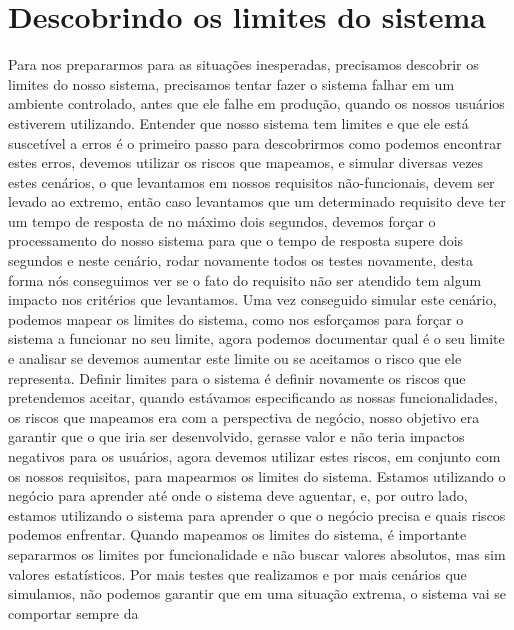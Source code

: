     \section{Descobrindo os limites do sistema}
      Para nos prepararmos para as situações inesperadas, precisamos descobrir os
      limites do nosso sistema, precisamos tentar fazer o sistema falhar em um
      ambiente controlado, antes que ele falhe em produção, quando os nossos usuários
      estiverem utilizando. Entender que nosso sistema tem limites e que ele está
      suscetível a erros é o primeiro passo para descobrirmos como podemos encontrar
      estes erros, devemos utilizar os riscos que mapeamos, e simular diversas vezes
      estes cenários, o que levantamos em nossos requisitos não-funcionais, devem
      ser levado ao extremo, então caso levantamos que um determinado requisito
      deve ter um tempo de resposta de no máximo dois segundos, devemos forçar o
      processamento do nosso sistema para que o tempo de resposta supere dois segundos
      e neste cenário, rodar novamente todos os testes novamente, desta forma nós
      conseguimos ver se o fato do requisito não ser atendido tem algum impacto nos
      critérios que levantamos. Uma vez conseguido simular este cenário, podemos
      mapear os limites do sistema, como nos esforçamos para forçar o sistema a
      funcionar no seu limite, agora podemos documentar qual é o seu limite e
      analisar se devemos aumentar este limite ou se aceitamos o risco que ele
      representa. \newline
      Definir limites para o sistema é definir novamente os riscos que pretendemos
      aceitar, quando estávamos especificando as nossas funcionalidades, os riscos
      que mapeamos era com a perspectiva de negócio, nosso objetivo era garantir que
      o que iria ser desenvolvido, gerasse valor e não teria impactos negativos para
      os usuários, agora devemos utilizar estes riscos, em conjunto com os nossos
      requisitos, para mapearmos os limites do sistema. Estamos utilizando o negócio
      para aprender até onde o sistema deve aguentar, e, por outro lado, estamos
      utilizando o sistema para aprender o que o negócio precisa e quais riscos
      podemos enfrentar. \newline
      Quando mapeamos os limites do sistema, é importante separarmos os limites por
      funcionalidade e não buscar valores absolutos, mas sim valores estatísticos.
      Por mais testes que realizamos e por mais cenários que simulamos, não podemos
      garantir que em uma situação extrema, o sistema vai se comportar sempre da
